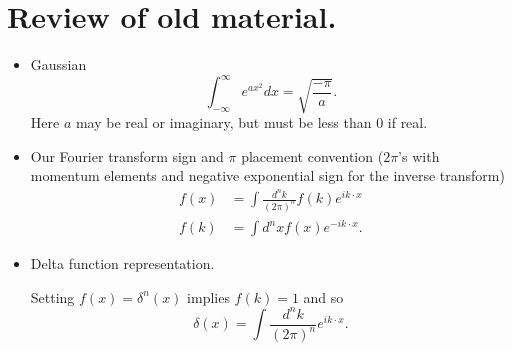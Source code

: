 %
%

\section{Review of old material.}

\begin{itemize}
\item Gaussian
\begin{dmath}\label{eqn:usefulFormulas:20}
\int_{-\infty}^\infty e^{a x^2} dx = \sqrt{\frac{-\pi}{a}}.
\end{dmath}
Here \( a \) may be real or imaginary, but must be less than 0 if real.
\item Our Fourier transform sign and \( \pi \) placement convention (\( 2 \pi\)'s with momentum elements and negative exponential sign for the inverse transform)
\begin{dmath}\label{eqn:usefulFormulas:40}
\begin{aligned}
f(x) &= \int \frac{d^n k}{(2 \pi)^n} f(k) e^{i k \cdot x} \\
f(k) &= \int d^n x f(x) e^{-i k \cdot x}.
\end{aligned}
\end{dmath}
\item Delta function representation.

Setting \( f(x) = \delta^n(x) \) implies \( f(k) = 1 \) and so
\begin{dmath}\label{eqn:usefulFormulas:60}
\delta(x) = \int \frac{d^n k}{(2 \pi)^n} e^{i k \cdot x}.
\end{dmath}


\end{itemize}
